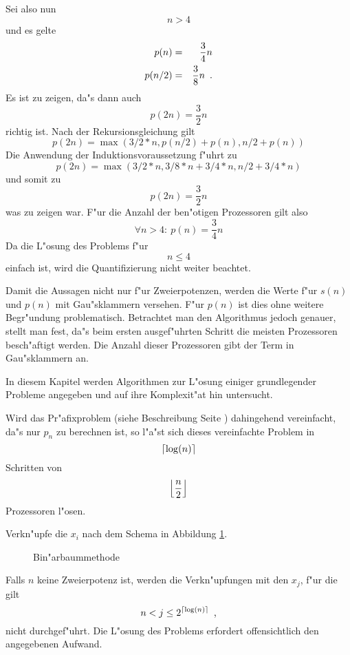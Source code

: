 \begin{beweis}
\begin{itemize}
          Sei also nun \[ n>4 \] und es gelte
          \begin{eqnarray*}
              p(n) & = & \frac{3}{4}n \\
              p(n/2) & = & \frac{3}{8}n \mbox{\hspace{0.5em}.}
          \end{eqnarray*}
          Es ist zu zeigen, da"s dann auch
          \[ p(2n)= \frac{3}{2}n \]
          richtig ist.
          Nach der Rekursionsgleichung  gilt
          \[ p(2n) = \max(3/2*n, p(n/2)+p(n), n/2 + p(n)) \]
          Die Anwendung der Induktionsvoraussetzung f"uhrt zu
          \[ p(2n) = \max(3/2*n, 3/8*n + 3/4*n, n/2 + 3/4*n) \] und somit zu
          \[ p(2n) = \frac{3}{2}n \] was zu zeigen war. F"ur die Anzahl der 
          ben"otigen Prozessoren gilt also
          \[ \forall n > 4: \: p(n) = \frac{3}{4}n \]
          Da die L"osung des Problems f"ur \[ n \leq 4 \] einfach ist, wird
          die Quantifizierung nicht weiter beachtet.
    \end{itemize}
    Damit die Aussagen nicht nur f"ur Zweierpotenzen, werden die Werte
    f"ur $s(n)$ und $p(n)$ mit Gau"sklammern versehen. F"ur $p(n)$ ist
    dies ohne weitere Begr"undung problematisch. Betrachtet man den 
    Algorithmus jedoch genauer, stellt man fest, da"s beim ersten 
    ausgef"uhrten Schritt die meisten Prozessoren besch"aftigt werden. 
    Die Anzahl dieser Prozessoren gibt der Term in Gau"sklammern an.
\end{beweis}


In diesem Kapitel werden Algorithmen zur L"osung einiger
grundlegender Probleme angegeben und auf ihre Komplexit"at hin untersucht.

\begin{satz}  %
\label{SatzAlgBinaerbaum}
    Wird das Pr"afixproblem (siehe Beschreibung Seite
    \pageref{PagePraefixproblem}) dahingehend vereinfacht, da"s nur
    $p_n$ zu berechnen ist, so l"a"st sich dieses vereinfachte Problem in
    \[ \left\lceil \log(n) \right\rceil \] Schritten von \[ \left\lfloor \frac{n}{2} \right\rfloor \] 
    Prozessoren l"osen.
\end{satz}
\begin{beweis}
    Verkn"upfe die $x_i$ nach dem Schema in Abbildung \ref{PicBinBaum}.
    \begin{figure}[htb]
    \begin{center}
        
        \caption{Bin"arbaummethode}
        \label{PicBinBaum}
    \end{center}
    \end{figure}
    Falls $n$ keine Zweierpotenz ist, werden die Verkn"upfungen mit den 
    $x_j$, f"ur die gilt \[ n < j \leq 2^{\left\lceil \log(n) \right\rceil} \mbox{\hspace{0.5em},} \]
    nicht durchgef"uhrt. Die L"osung des Problems erfordert offensichtlich
    den angegebenen Aufwand.
    \mbox{ \hspace{4em} \hfill }
\end{beweis}

